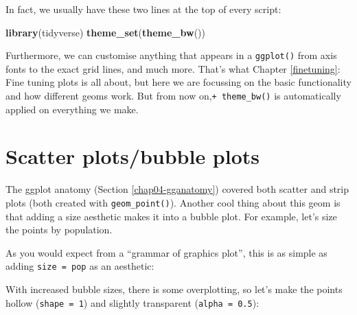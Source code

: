 \documentclass[
  12pt,
  krantz2]{krantz}
\makeatletter
\newenvironment{Shaded}{\begin{snugshade}}{\end{snugshade}}
\newcommand{\DataTypeTok}[1]{\textcolor[rgb]{0.13,0.29,0.53}{#1}}
\newcommand{\DecValTok}[1]{\textcolor[rgb]{0.00,0.00,0.81}{#1}}
\newcommand{\KeywordTok}[1]{\textcolor[rgb]{0.13,0.29,0.53}{\textbf{#1}}}
\newcommand{\NormalTok}[1]{#1}
\newcommand{\OperatorTok}[1]{\textcolor[rgb]{0.81,0.36,0.00}{\textbf{#1}}}
\newcommand{\StringTok}[1]{\textcolor[rgb]{0.31,0.60,0.02}{#1}}
\newenvironment{kframe}{%
\medskip{}
\setlength{\fboxsep}{.8em}
 \def\at@end@of@kframe{}%
 \ifinner\ifhmode%
  \def\at@end@of@kframe{\end{minipage}}%
  \begin{minipage}{\columnwidth}%
 \fi\fi%
 \def\FrameCommand##1{\hskip\@totalleftmargin \hskip-\fboxsep
 \colorbox{shadecolor}{##1}\hskip-\fboxsep
     \hskip-\linewidth \hskip-\@totalleftmargin \hskip\columnwidth}%
 \MakeFramed {\advance\hsize-\width
   \@totalleftmargin\z@ \linewidth\hsize
   \@setminipage}}%
 {\par\unskip\endMakeFramed%
 \at@end@of@kframe}
\renewenvironment{Shaded}{\begin{kframe}}{\end{kframe}}
\makeatother
\begin{document}
In fact, we usually have these two lines at the top of every script:

\begin{Shaded}
\begin{Highlighting}[]
\KeywordTok{library}\NormalTok{(tidyverse)}
\KeywordTok{theme_set}\NormalTok{(}\KeywordTok{theme_bw}\NormalTok{())}
\end{Highlighting}
\end{Shaded}

Furthermore, we can customise anything that appears in a \texttt{ggplot()} from axis fonts to the exact grid lines, and much more.
That's what Chapter \ref{finetuning}: Fine tuning plots is all about, but here we are focussing on the basic functionality and how different geoms work.
But from now on,\texttt{+\ theme\_bw()} is automatically applied on everything we make.

\hypertarget{scatter-plotsbubble-plots}{%
\section{Scatter plots/bubble plots}\label{scatter-plotsbubble-plots}}


The ggplot anatomy (Section \ref{chap04-gganatomy}) covered both scatter and strip plots (both created with \texttt{geom\_point()}).
Another cool thing about this geom is that adding a size aesthetic makes it into a bubble plot.
For example, let's size the points by population.

As you would expect from a ``grammar of graphics plot'', this is as simple as adding \texttt{size\ =\ pop} as an aesthetic:

\begin{Shaded}
\end{Shaded}

With increased bubble sizes, there is some overplotting, so let's make the points hollow (\texttt{shape\ =\ 1}) and slightly transparent (\texttt{alpha\ =\ 0.5}):
\end{document}
